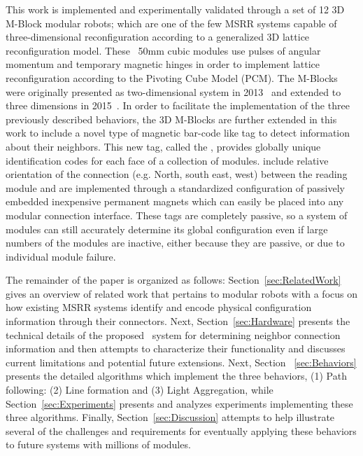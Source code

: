 This work is implemented and experimentally validated through a set of 12 3D M-Block modular robots; which are one of the few MSRR systems capable of three-dimensional reconfiguration according to a generalized 3D lattice reconfiguration model. These ~50mm cubic modules use pulses of angular momentum and temporary magnetic hinges in order to implement lattice reconfiguration according to the Pivoting Cube Model (PCM). The M-Blocks were originally presented as two-dimensional system in 2013~\cite{RomanishinRus-IROS13} and extended to three dimensions in 2015~\cite{Romanishin20153d}. In order to facilitate the implementation of the three previously described behaviors, the 3D M-Blocks are further extended in this work to include a novel type of magnetic bar-code like tag to detect information about their neighbors. This new tag, called the \tagNamePlural, provides globally unique identification codes for each face of a collection of modules. \textit{\TagNamePlural} include relative orientation of the connection (e.g. North, south east, west) between the reading module and are implemented through a standardized configuration of passively embedded inexpensive permanent magnets which can easily be placed into any modular connection interface. These tags are completely passive, so a system of modules can still accurately determine its global configuration even if large numbers of the modules are inactive, either because they are passive, or due to individual module failure.

The remainder of the paper is organized as follows: Section~\ref{sec:RelatedWork} gives an overview of related work that pertains to modular robots with a focus on how existing MSRR systems identify and encode physical configuration information through their connectors. Next, Section~\ref{sec:Hardware} presents the technical details of the proposed \tagNamePlural~system for determining neighbor connection information and then attempts to characterize their functionality and discusses current limitations and potential future extensions. Next, Section ~\ref{sec:Behaviors} presents the detailed algorithms which implement the three behaviors, (1) Path following: (2) Line formation and (3) Light Aggregation, while Section~\ref{sec:Experiments} presents and analyzes experiments implementing these three algorithms. Finally, Section~\ref{sec:Discussion} attempts to help illustrate several of the challenges and requirements for eventually applying these behaviors to future systems with millions of modules.


%
%	
%
%
%
%
%
%
